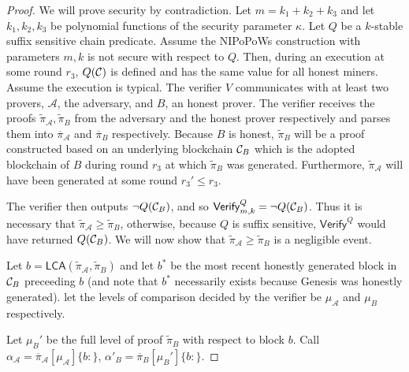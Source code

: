 \begin{proof}
    We will prove security by contradiction.  Let $m = k_1 + k_2 + k_3$ and let
    $k_1, k_2, k_3$ be polynomial functions of the security parameter $\kappa$.
    Let $Q$ be a $k$-stable suffix sensitive chain predicate. Assume the
    NIPoPoWs construction with parameters $m, k$ is not secure with respect to
    $Q$. Then, during an execution at some round $r_3$, $Q(\mathcal{C})$ is defined
    and has the same value for all honest miners.  Assume the execution is
    typical. The verifier $V$ communicates with at least two provers,
    $\mathcal{A}$, the adversary, and $B$, an honest prover.  The verifier
    receives the proofs $\tilde\pi_\mathcal{A}, \tilde\pi_B$ from the adversary
    and the honest prover respectively and parses them into
    $\overline\pi_\mathcal{A}$ and $\overline\pi_B$ respectively. Because $B$ is
    honest, $\tilde\pi_B$ will be a proof constructed based on an underlying
    blockchain $\mathcal{C}_B$ which is the adopted blockchain of $B$ during round
    $r_3$ at which $\tilde\pi_B$ was generated. Furthermore,
    $\tilde\pi_\mathcal{A}$ will have been generated at some round $r_3' \leq
    r_3$.

    The verifier then outputs $\lnot Q(\mathcal{C}_B)$, and so
    $\textsf{Verify}^Q_{m,k} = \lnot Q(\mathcal{C}_B)$. Thus it is necessary that
    $\tilde\pi_\mathcal{A} \geq \tilde\pi_B$, otherwise, because $Q$
    is suffix sensitive, $\textsf{Verify}^Q$ would have returned $Q(\mathcal{C}_B)$.
    We will now show that $\tilde\pi_\mathcal{A} \geq \tilde\pi_B$ is
    a negligible event.

    Let $b = \textsf{LCA}(\tilde\pi_\mathcal{A}, \tilde\pi_B)$ and let $b^*$ be
    the most recent honestly generated block in $\mathcal{C}_B$ preceeding $b$ (and note that $b^*$ necessarily exists because Genesis was honestly generated).
    let the levels of comparison decided by the verifier be $\mu_\mathcal{A}$
    and $\mu_B$ respectively.

    Let $\mu_B'$ be the full level of proof $\tilde\pi_B$ with respect to block
    $b$. Call $\alpha_\mathcal{A} =
    \overline\pi_\mathcal{A}[\mu_\mathcal{A}]\{b:\}$,
    $\alpha'_B = \overline\pi_B[\mu_B']\{b:\}$.



\end{proof}
